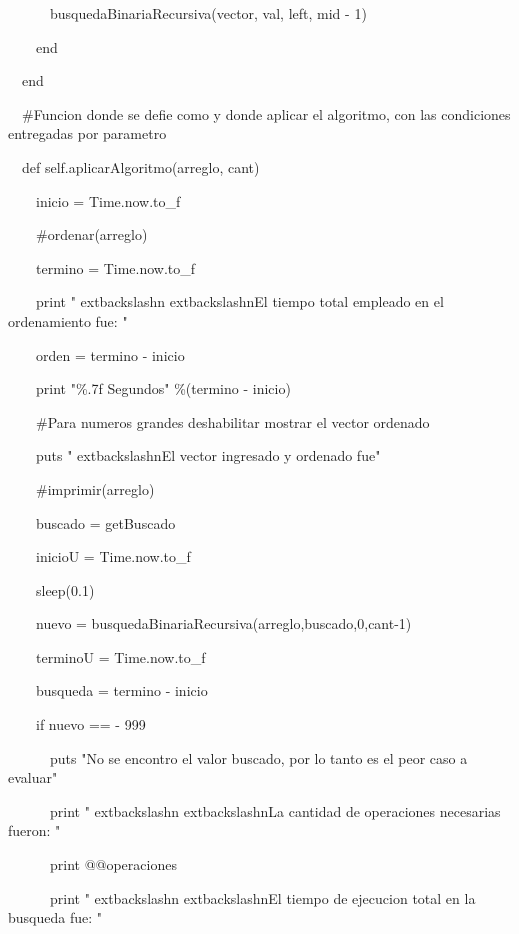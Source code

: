 {\noindent \ \ \ \ \ \       busquedaBinariaRecursiva(vector, val, left, mid - 1)

\noindent \ \ \ \     end

\noindent \ \   end

\bigskip 
\noindent \ \   \#Funcion donde se defie como y donde aplicar el algoritmo, con las condiciones entregadas por parametro

\noindent \ \   def self.aplicarAlgoritmo(arreglo, cant)

\noindent \ \ \ \     inicio = Time.now.to\_f 

\noindent \ \ \ \     \#ordenar(arreglo)

\noindent \ \ \ \     termino = Time.now.to\_f

\noindent \ \ \ \     print "	extbackslashn	extbackslashnEl tiempo total empleado en el ordenamiento fue: "    

\noindent \ \ \ \     orden = termino - inicio

\noindent \ \ \ \     print  "\%.7f Segundos" \%(termino - inicio) 

\bigskip 
\noindent \ \ \ \     \#Para numeros grandes deshabilitar mostrar el vector ordenado

\noindent \ \ \ \     puts "	extbackslashnEl vector ingresado y ordenado fue"    

\noindent \ \ \ \     \#imprimir(arreglo)    

\bigskip 
\noindent \ \ \ \     buscado = getBuscado

\noindent \ \ \ \     inicioU = Time.now.to\_f 

\noindent \ \ \ \     sleep(0.1)

\noindent \ \ \ \     nuevo = busquedaBinariaRecursiva(arreglo,buscado,0,cant-1)

\noindent \ \ \ \     terminoU = Time.now.to\_f    

\noindent \ \ \ \     busqueda = termino - inicio

\noindent \ \ \ \     if nuevo == - 999

\noindent \ \ \ \ \ \       puts "No se encontro el valor buscado, por lo tanto es el peor caso a evaluar"     

\noindent \ \ \ \ \ \       print "	extbackslashn	extbackslashnLa cantidad de operaciones necesarias fueron: "

\noindent \ \ \ \ \ \       print @@operaciones  

\noindent \ \ \ \ \ \       print "	extbackslashn	extbackslashnEl tiempo de ejecucion total en la busqueda fue: "    

}
